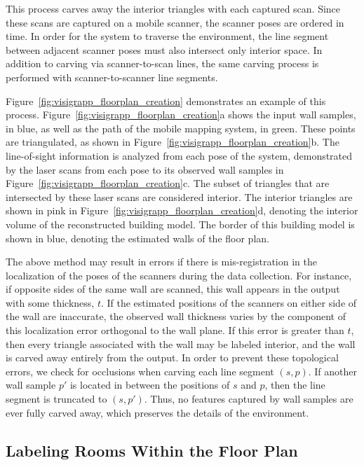 \documentclass[12pt,onecolumn,oneside]{book}
\begin{document}
This process carves away the interior triangles with each captured scan.  Since these scans are captured on a mobile scanner, the scanner poses are ordered in time.  In order for the system to traverse the environment, the line segment between adjacent scanner poses must also intersect only interior space.  In addition to carving via scanner-to-scan lines, the same carving process is performed with scanner-to-scanner line segments.

Figure~\ref{fig:visigrapp_floorplan_creation} demonstrates an example of this process.  Figure~\ref{fig:visigrapp_floorplan_creation}a shows the input wall samples, in blue, as well as the path of the mobile mapping system, in green.  These points are triangulated, as shown in Figure~\ref{fig:visigrapp_floorplan_creation}b.  The line-of-sight information is analyzed from each pose of the system, demonstrated by the laser scans from each pose to its observed wall samples in Figure~\ref{fig:visigrapp_floorplan_creation}c.  The subset of triangles that are intersected by these laser scans are considered interior.  The interior triangles are shown in pink in Figure~\ref{fig:visigrapp_floorplan_creation}d, denoting the interior volume of the reconstructed building model.  The border of this building model is shown in blue, denoting the estimated walls of the floor plan.

The above method may result in errors if there is mis-registration in the localization of the poses of the scanners during the data collection.  For instance, if opposite sides of the same wall are scanned, this wall appears in the output with some thickness, $t$.  If the estimated positions of the scanners on either side of the wall are inaccurate, the observed wall thickness varies by the component of this localization error orthogonal to the wall plane.  If this error is greater than $t$, then every triangle associated with the wall may be labeled interior, and the wall is carved away entirely from the output.  In order to prevent these topological errors, we check for occlusions when carving each line segment $(s,p)$.  If another wall sample $p'$ is located in between the positions of $s$ and $p$, then the line segment is truncated to $(s,p')$.  Thus, no features captured by wall samples are ever fully carved away, which preserves the details of the environment.

\subsection{Labeling Rooms Within the Floor Plan}
\label{ssec:room_label}
\end{document}
